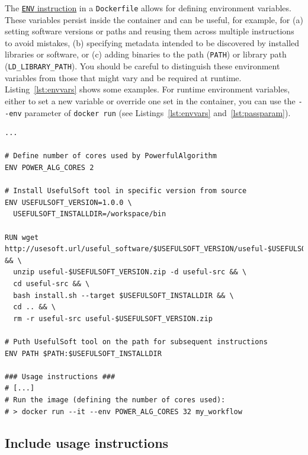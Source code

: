 \documentclass[10pt,letterpaper]{article}
\begin{document}
The
\href{https://docs.docker.com/engine/reference/builder/\#env}{\texttt{ENV}
instruction} in a \texttt{Dockerfile} allows for defining environment
variables. These variables persist inside the container and can be
useful, for example, for (a) setting software versions or paths and
reusing them across multiple instructions to avoid mistakes, (b)
specifying metadata intended to be discovered by installed libraries or
software, or (c) adding binaries to the path (\texttt{PATH}) or library
path (\texttt{LD\_LIBRARY\_PATH}). You should be careful to distinguish
these environment variables from those that might vary and be required
at runtime. Listing~\ref{lst:envvars} shows some examples. For runtime
environment variables, either to set a new variable or override one set
in the container, you can use the \texttt{-\/-env} parameter of
\texttt{docker\ run} (see Listings~\ref{lst:envvars}
and~\ref{lst:passparam}).

\scriptsize

\begin{minipage}{\linewidth}

\begin{lstlisting}[language=docker,caption={Partial \texttt{Dockerfile} showing usage of environment variables with the `ENV` instruction.},breaklines=true,label={lst:envvars}]
...

# Define number of cores used by PowerfulAlgorithm
ENV POWER_ALG_CORES 2

# Install UsefulSoft tool in specific version from source
ENV USEFULSOFT_VERSION=1.0.0 \
  USEFULSOFT_INSTALLDIR=/workspace/bin

RUN wget http://usesoft.url/useful_software/$USEFULSOFT_VERSION/useful-$USEFULSOFT_VERSION.zip && \
  unzip useful-$USEFULSOFT_VERSION.zip -d useful-src && \
  cd useful-src && \
  bash install.sh --target $USEFULSOFT_INSTALLDIR && \
  cd .. && \
  rm -r useful-src useful-$USEFULSOFT_VERSION.zip

# Puth UsefulSoft tool on the path for subsequent instructions
ENV PATH $PATH:$USEFULSOFT_INSTALLDIR

### Usage instructions ###
# [...]
# Run the image (defining the number of cores used):
# > docker run --it --env POWER_ALG_CORES 32 my_workflow
\end{lstlisting}

\end{minipage}

\normalsize

\hypertarget{include-usage-instructions}{%
\subsection{Include usage
instructions}\label{include-usage-instructions}}
\end{document}
